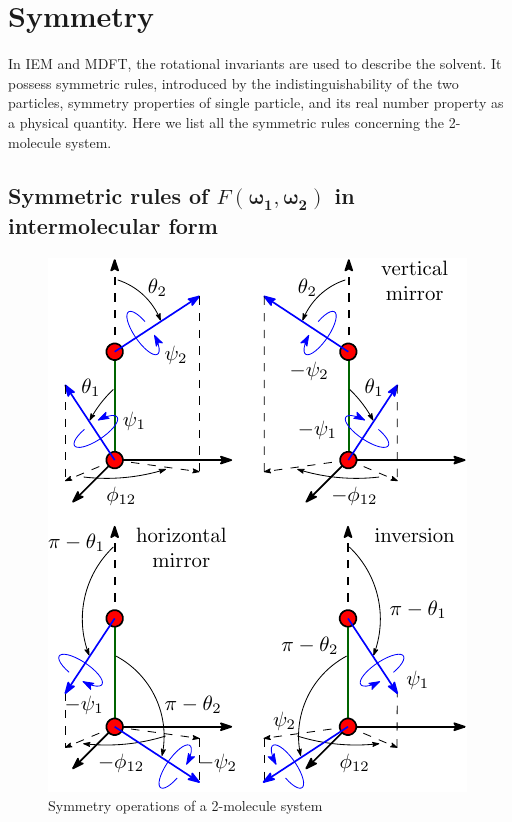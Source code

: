 \section{Symmetry}

In IEM and MDFT, the rotational invariants are used to describe the
solvent. It possess symmetric rules, introduced by the indistinguishability
of the two particles, symmetry properties of single particle, and
its real number property as a physical quantity. Here we list all
the symmetric rules concerning the 2-molecule system.


\subsection{Symmetric rules of $F(\boldsymbol{\omega_{1}},\boldsymbol{\omega_{2}})$
in intermolecular form}

\begin{figure}[h]
\begin{centering}
\includegraphics{_figure/symmetry_dcf}
\par\end{centering}

\caption{Symmetry operations of a 2-molecule system\label{fig:Symmetry-operations}}
\end{figure}


